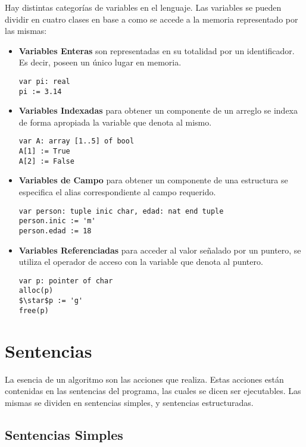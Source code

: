 \documentclass{article}
\begin{document}
Hay distintas categorías de variables en el lenguaje.
Las variables se pueden dividir en cuatro clases en base a como se accede a la memoria representado por las mismas:

\begin{itemize}
\item \textbf{Variables Enteras} son representadas en su totalidad por un identificador. Es decir, poseen un único lugar en memoria.

\begin{lstlisting}
var pi: real
pi := 3.14
\end{lstlisting}

\item \textbf{Variables Indexadas} para obtener un componente de un arreglo se indexa de forma apropiada la variable que denota al mismo.

\begin{lstlisting}
var A: array [1..5] of bool
A[1] := True
A[2] := False
\end{lstlisting}

\item \textbf{Variables de Campo} para obtener un componente de una estructura se especifica el alias correspondiente al campo requerido.

\begin{lstlisting}
var person: tuple inic char, edad: nat end tuple
person.inic := 'm'
person.edad := 18
\end{lstlisting}

\item \textbf{Variables Referenciadas} para acceder al valor señalado por un puntero, se utiliza el operador de acceso con la variable que denota al puntero.

\begin{lstlisting}
var p: pointer of char
alloc(p)
$\star$p := 'g'
free(p)
\end{lstlisting}

\end{itemize}

\section{Sentencias}

La esencia de un algoritmo son las acciones que realiza.
Estas acciones están contenidas en las sentencias del programa, las cuales se dicen ser ejecutables.
Las mismas se dividen en sentencias simples, y sentencias estructuradas.

\subsection{Sentencias Simples}
\end{document}
